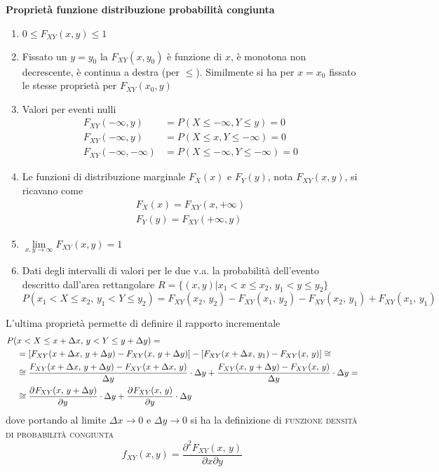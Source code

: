\textbf{Proprietà funzione distribuzione probabilità congiunta}
\begin{enumerate}
\item $0\leq F_{XY}(x,y)\leq 1$
\item Fissato un $y=y_0$ la $F_{XY}(x,y_0)$ è funzione di $x$, è monotona non decrescente, è continua a destra (per $\leq$).
Similmente si ha per $x=x_0$ fissato le stesse proprietà per $F_{XY}(x_0,y)$
\item Valori per eventi nulli
\[
	\begin{split}
		F_{XY}(-\infty,y)&=P(X\leq -\infty,Y\leq y)=0\\
		F_{XY}(-\infty,y)&=P(X\leq x,Y\leq -\infty)=0\\
		F_{XY}(-\infty,-\infty)&=P(X\leq -\infty,Y\leq -\infty)=0
	\end{split}
\]
\item Le funzioni di distribuzione marginale $F_X(x)$ e $F_Y(y)$, nota $F_{XY}(x,y)$, si ricavano come
\[
	\begin{split}
		F_X(x)=F_{XY}(x,+\infty)\\F_Y(y)=F_{XY}(+\infty,y)
	\end{split}
\]
\item $\lim\limits_{x,y\to\infty}F_{XY}(x,y)=1$
\item Dati degli intervalli di valori per le due v.a. la probabilità dell'evento descritto dall'area rettangolare $R=\{(x,y)|x_1<x\leq x_2,\, y_1<y\leq y_2\}$
\[
	P(x_1<X\leq x_2,\,y_1<Y\leq y_2)= F_{XY}(x_2,\,y_2)-F_{XY}(x_1,\,y_2)-F_{XY}(x_2,\,y_1)+F_{XY}(x_1,\,y_1)
\]
\end{enumerate}
L'ultima proprietà permette di definire il rapporto incrementale
\[
	\begin{split}
		P(&x<X\leq x+\Delta x,\,y<Y\leq y+\Delta y)=\\
		&=\left[F_{XY}(x+\Delta x,\,y+\Delta y)-F_{XY}(x,\,y+\Delta y)\right]-\left[F_{XY}(x+\Delta x,\,y_1)-F_{XY}(x,\,y)\right]\cong\\
		&\cong\frac{F_{XY}(x+\Delta x,\,y+\Delta y)-F_{XY}(x+\Delta x,\,y)}{\Delta y}\cdot\Delta y+\frac{F_{XY}(x,\,y+\Delta y)-F_{XY}(x,\,y)}{\Delta y}\cdot\Delta y=\\
		&\cong\frac{\partial^{}F_{XY}(x,\,y+\Delta y)}{\partial y^{}}\cdot\Delta y+\frac{\partial^{}F_{XY}(x,\,y)}{\partial y^{}}\cdot\Delta y
	\end{split}
\]
dove portando al limite $\Delta x\to 0$ e $\Delta y\to 0$ si ha la definizione di \textsc{funzione densità di probabilità congiunta}
\begin{equation}
	f_{XY}(x,y)=\frac{\partial^2 F_{XY}(x,\,y)}{\partial x\partial y}
\end{equation}

